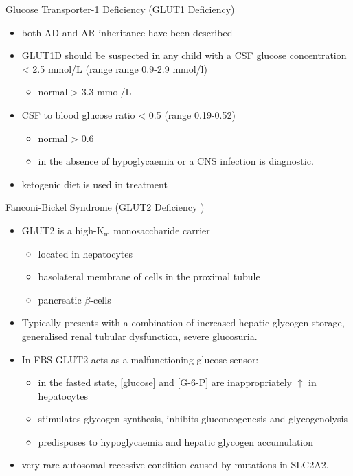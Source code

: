 \documentclass[presentation, smaller]{beamer}
\begin{document}
\begin{frame}[label={sec:org10a9eb7}]{Glucose Transporter-1 Deficiency (GLUT1 Deficiency)}
\begin{itemize}
\item both AD and AR inheritance have been described

\item GLUT1D should be suspected in any child with a CSF glucose
concentration \textless{} 2.5 mmol/L (range range 0.9-2.9 mmol/l)
\begin{itemize}
\item normal \textgreater{} 3.3 mmol/L
\end{itemize}

\item CSF to blood glucose ratio \textless{} 0.5 (range 0.19-0.52)
\begin{itemize}
\item normal \textgreater{} 0.6
\item in the absence of hypoglycaemia or a CNS infection is diagnostic.
\end{itemize}
\item ketogenic diet is used in treatment
\end{itemize}
\end{frame}

\begin{frame}[label={sec:orgf67aab3}]{Fanconi-Bickel Syndrome (GLUT2 Deficiency )}
\begin{itemize}
\item GLUT2 is a high-K\(_{\text{m}}\) monosaccharide carrier 
\begin{itemize}
\item located in hepatocytes
\item basolateral membrane of cells in the proximal tubule
\item pancreatic \(\beta\)-cells
\end{itemize}

\item Typically presents with a combination of increased hepatic
glycogen storage, generalised renal tubular dysfunction, severe glucosuria.

\item In FBS GLUT2 acts as a malfunctioning glucose sensor:
\begin{itemize}
\item in the fasted state, [glucose] and [G-6-P] are inappropriately \(\uparrow\) in hepatocytes
\item stimulates glycogen synthesis, inhibits gluconeogenesis and glycogenolysis
\item predisposes to hypoglycaemia and hepatic glycogen accumulation
\end{itemize}

\item very rare autosomal recessive condition caused by mutations in
SLC2A2.
\end{itemize}
\end{frame}
\end{document}
